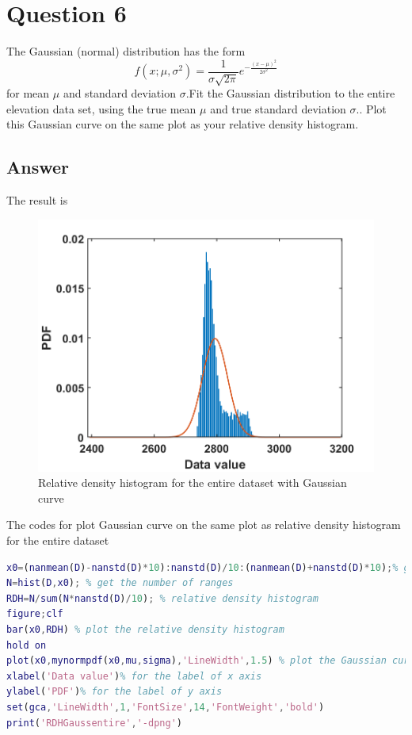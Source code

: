 \documentclass[
	12pt, %
]{fphw}
\begin{document}
\section*{Question 6 }

\begin{problem}
The Gaussian (normal) distribution has the form
\begin{equation}
f\left( {x;\mu ,{\sigma ^2}} \right) = \frac{1}{{\sigma \sqrt {2\pi } }}{e^{ - \frac{{{{(x - \mu )}^2}}}{{2{\sigma ^2}}}}}
\end{equation}
for mean $\mu $ and standard deviation  $\sigma $.Fit the Gaussian distribution to
the entire elevation data set, using the true mean $\mu $ and true standard deviation $\sigma $.. Plot this
Gaussian curve on the same plot as your relative density histogram.
	
\end{problem}

\subsection*{Answer}

The result is

\begin{figure}[htbp]
	\centering
	\includegraphics[width=0.7\columnwidth]{RDHGaussentire.png} 
	\caption{Relative density histogram for the entire dataset with Gaussian curve}
\end{figure}


The codes for plot Gaussian curve on the same plot as relative density histogram for the entire dataset

\begin{lstlisting}[language=Matlab,escapeinside=``]
x0=(nanmean(D)-nanstd(D)*10):nanstd(D)/10:(nanmean(D)+nanstd(D)*10);% give the central points
N=hist(D,x0); % get the number of ranges
RDH=N/sum(N*nanstd(D)/10); % relative density histogram
figure;clf
bar(x0,RDH) % plot the relative density histogram
hold on
plot(x0,mynormpdf(x0,mu,sigma),'LineWidth',1.5) % plot the Gaussian curve
xlabel('Data value')% for the label of x axis
ylabel('PDF')% for the label of y axis
set(gca,'LineWidth',1,'FontSize',14,'FontWeight','bold')
print('RDHGaussentire','-dpng')

\end{lstlisting} 
\end{document}
